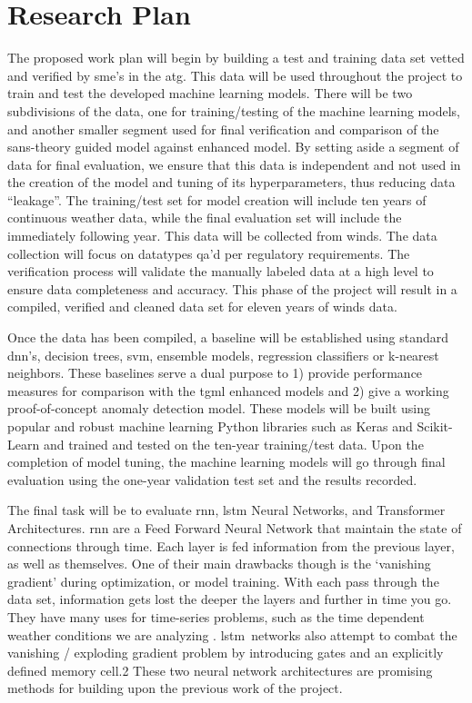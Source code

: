 \section{Research Plan}
\label{sec:researchplan}
The proposed work plan will begin by building a test and training data set vetted and verified by \gls{sme}’s in the \gls{atg}.  This data will be used throughout the project to train and test the developed machine learning models.  There will be two subdivisions of the data, one for training/testing of the machine learning models, and another smaller segment used for final verification and comparison of the sans-theory guided model against enhanced model.  By setting aside a segment of data for final evaluation, we ensure that this data is independent and not used in the creation of the model and tuning of its hyperparameters, thus reducing data “leakage”. The training/test set for model creation will include ten years of continuous weather data, while the final evaluation set will include the immediately following year. This data will be collected from \gls{winds}. The data collection will focus on datatypes \gls{qa}’d per regulatory requirements. The verification process will validate the manually labeled data at a high level to ensure data completeness and accuracy. This phase of the project will result in a compiled, verified and cleaned data set for eleven years of \gls{winds} data.  

Once the data has been compiled, a baseline will be established using standard \gls{dnn}’s, decision trees, \gls{svm}, ensemble models, regression classifiers or k-nearest neighbors.  These baselines serve a dual purpose to 1) provide performance measures for comparison with the \gls{tgml} enhanced models and 2) give a working proof-of-concept anomaly detection model. These models will be built using popular and robust machine learning Python libraries such as Keras and Scikit-Learn and trained and tested on the ten-year training/test data. Upon the completion of model tuning, the machine learning models will go through final evaluation using the one-year validation test set and the results recorded.

The final task will be to evaluate \gls{rnn}, \gls{lstm} Neural Networks, and Transformer Architectures.  \gls{rnn} are a Feed Forward Neural Network that maintain the state of connections through time. Each layer is fed information from the previous layer, as well as themselves.  One of their main drawbacks though is the ‘vanishing gradient’ during optimization, or model training.  With each pass through the data set, information gets lost the deeper the layers and further in time you go.  They have many uses for time-series problems, such as the time dependent weather conditions we are analyzing \cite{elmanFindingStructureTime1990a}. \gls{lstm} networks also attempt to combat the vanishing / exploding gradient problem by introducing gates and an explicitly defined memory cell.2  These two neural network architectures are promising methods for building upon the previous work of the project.

